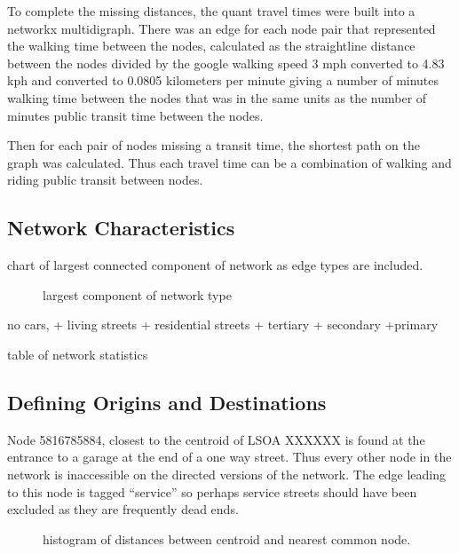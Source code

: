 To complete the missing distances, the quant travel times were built into a networkx multidigraph. There was an edge for each node pair that represented the walking time between the nodes, calculated as the straightline distance between the nodes divided by the google walking speed 3 mph converted to 4.83 kph and converted to  0.0805 kilometers per minute giving a number of minutes walking time between the nodes that was in the same units as the number of minutes public transit time between the nodes. 

Then for each pair of nodes missing a transit time, the shortest path on the graph was calculated. Thus each travel time can be a combination of walking and riding public transit between nodes. 


\subsection{Network Characteristics}

chart of largest connected component of network as edge types are included. 

\begin{figure}
\centering
\caption{largest component of network type}
\label{fig:connected_component}
\end{figure}

no cars,
+ living streets
+ residential streets
+ tertiary 
+ secondary
+primary

\begin{table}
\centering
\caption{table of network statistics}
\label{table:network_stats}
\end{table}

\subsection{Defining Origins and Destinations}

Node 5816785884, closest to the centroid of LSOA XXXXXX is found at the entrance to a garage at the end of a one way street. Thus every other node in the network is inaccessible on the directed versions of the network. The edge leading to this node is tagged ``service'' so perhaps service streets should have been excluded as they are frequently dead ends. 

\begin{figure}
\centering
\caption{histogram of distances between centroid and nearest common node. }
\label{fig:centroid_node_dist_hist}
\end{figure}

